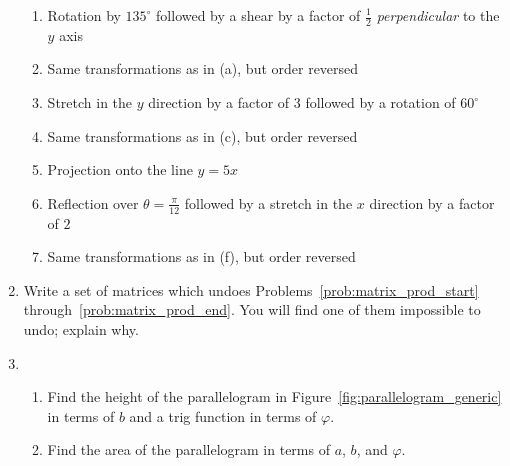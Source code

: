 \documentclass[../gatm.tex]{subfiles}
\begin{document}
\begin{enumerate}
\begin{enumerate}
\item Rotation by $135^\circ$ followed by a shear by a factor of $\frac{1}{2}$ \textit{perpendicular} to the $y$ axis \label{prob:matrix_prod_start}
\item Same transformations as in (a), but order reversed
\item Stretch in the $y$ direction by a factor of $3$ followed by a rotation of $60^\circ$
\item Same transformations as in (c), but order reversed
\item Projection onto the line $y=5x$
\item Reflection over $\theta=\frac{\pi}{12}$ followed by a stretch in the $x$ direction by a factor of $2$
\item Same transformations as in (f), but order reversed \label{prob:matrix_prod_end}
\end{enumerate}
\item Write a set of matrices which undoes Problems~\ref{prob:matrix_prod_start} through~\ref{prob:matrix_prod_end}. You will find one of them impossible to undo; explain why.
\item \begin{enumerate}
\item Find the height of the parallelogram in Figure~\ref{fig:parallelogram_generic} in terms of $b$ and a trig function in terms of $\varphi$.
\item Find the area of the parallelogram in terms of $a$, $b$, and $\varphi$.
\end{enumerate}
\setcounter{problem_i}{\value{enumi}}
\end{enumerate}
\end{document}
